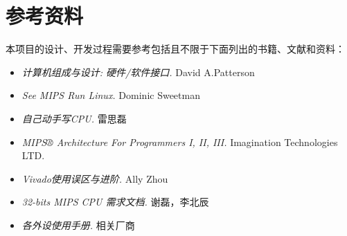 \section{参考资料}

本项目的设计、开发过程需要参考包括且不限于下面列出的书籍、文献和资料：
\begin{itemize}
    \item \textit{计算机组成与设计: 硬件/软件接口.} David A.Patterson
    \item \textit{See MIPS Run Linux.} Dominic Sweetman
    \item \textit{自己动手写CPU.} 雷思磊
    \item \textit{MIPS® Architecture For Programmers I, II, III.} Imagination Technologies LTD.
    \item \textit{Vivado使用误区与进阶.} Ally Zhou
    \item \textit{32-bits MIPS CPU 需求文档.} 谢磊，李北辰
    \item \textit{各外设使用手册.} 相关厂商
\end{itemize}